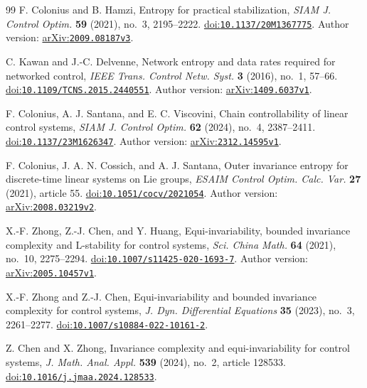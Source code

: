 \documentclass[11pt,a4paper]{article}
\theoremstyle{definition}
\theoremstyle{remark}
\begin{document}
\begin{thebibliography}{99}
F. Colonius and B. Hamzi, Entropy for practical stabilization,
\emph{SIAM J. Control Optim.} \textbf{59} (2021), no.~3, 2195--2222.
\href{https://doi.org/10.1137/20M1367775}{doi:\nolinkurl{10.1137/20M1367775}}. Author version: \href{https://arxiv.org/abs/2009.08187v3}{arXiv:\nolinkurl{2009.08187v3}}.

C. Kawan and J.-C. Delvenne, Network entropy and data rates required for networked control,
\emph{IEEE Trans. Control Netw. Syst.} \textbf{3} (2016), no.~1, 57--66.
\href{https://doi.org/10.1109/TCNS.2015.2440551}{doi:\nolinkurl{10.1109/TCNS.2015.2440551}}. Author version: \href{https://arxiv.org/abs/1409.6037v1}{arXiv:\nolinkurl{1409.6037v1}}.

F. Colonius, A. J. Santana, and E. C. Viscovini,
Chain controllability of linear control systems,
\emph{SIAM J. Control Optim.} \textbf{62} (2024), no.~4, 2387--2411.
\href{https://doi.org/10.1137/23M1626347}{doi:\nolinkurl{10.1137/23M1626347}}. Author version: \href{https://arxiv.org/abs/2312.14595v1}{arXiv:\nolinkurl{2312.14595v1}}.

F. Colonius, J. A. N. Cossich, and A. J. Santana,
Outer invariance entropy for discrete-time linear systems on Lie groups,
\emph{ESAIM Control Optim. Calc. Var.} \textbf{27} (2021), article 55.
\href{https://doi.org/10.1051/cocv/2021054}{doi:\nolinkurl{10.1051/cocv/2021054}}. Author version: \href{https://arxiv.org/abs/2008.03219v2}{arXiv:\nolinkurl{2008.03219v2}}.

X.-F. Zhong, Z.-J. Chen, and Y. Huang,
Equi-invariability, bounded invariance complexity and L-stability for control systems,
\emph{Sci. China Math.} \textbf{64} (2021), no.~10, 2275--2294.
\href{https://doi.org/10.1007/s11425-020-1693-7}{doi:\nolinkurl{10.1007/s11425-020-1693-7}}. Author version: \href{https://arxiv.org/abs/2005.10457v1}{arXiv:\nolinkurl{2005.10457v1}}.

X.-F. Zhong and Z.-J. Chen, Equi-invariability and bounded invariance complexity for control systems,
\emph{J. Dyn. Differential Equations} \textbf{35} (2023), no.~3, 2261--2277.
\href{https://doi.org/10.1007/s10884-022-10161-2}{doi:\nolinkurl{10.1007/s10884-022-10161-2}}.

Z. Chen and X. Zhong, Invariance complexity and equi-invariability for control systems,
\emph{J. Math. Anal. Appl.} \textbf{539} (2024), no.~2, article 128533.
\href{https://doi.org/10.1016/j.jmaa.2024.128533}{doi:\nolinkurl{10.1016/j.jmaa.2024.128533}}.


\end{thebibliography}
\end{document}
